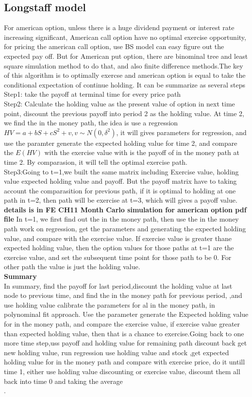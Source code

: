 \documentclass[a4paper,11pt]{article}
\begin{document}
\subsection{Longstaff model}
For american option, unless there is a huge dividend payment or interest rate increasing significant, American call option have no optimal exercise opportunity, for pricing the american call option, use BS model can easy figure out the expected pay off. But for American put option, there are binominal tree and least square simulation method to do that, and also finite difference methods.The key of this algorithm is to optimally exercse and american option is equal to take the conditional expectation of continue holding. It can be summarize as several steps\\
Step1: take the payoff at terminal time for every price path\\
Step2: Calculate the holding value as the present value of option in next time point, discount the previous payoff into period 2 as the holding value. At time 2, we find the in the money path, the idea is use a regression $HV=a+bS+cS^2+v,v\sim N(0,\delta^2)$, it will gives parameters for regression, and use the paramter generate the expected holding value for time 2, and compare the $E(HV)$ with the exercise value with is the payoff of in the money path at time 2. By comparasion, it will tell the optimal exercise path.\\
Step3:Going to t=1,we built the same matrix including Exercise value, holding value expected holding value and payoff. But the payoff matrix have to taking account the comparasition for previous path, if it is optimal to holding at one path in t=2, then path will be exercise at t=3, which will gives a payoff value. {\bf details is in FE CH11 Month Carlo simulation for american option pdf file} In t=1, we first find out the in the money path, then use the in the money path work on regression, get the parameters and generating the expected holding value, and compare with the exercise value. If exercise value is greater thane expected holding value, then the option values for those paths at t=1 are the exercise value, and set the subsequent time point for those path to be 0. For other path the value is just the holding value.\\
{\bf Summary}\\
In summary, find the payoff for last period,discount the holding value at last node to previous time, and find the in the money path for previous period, ,and use holding value calibrate the parameters for al in the money path, in polynominal fit approach. Use the parameter generate the Expected holding value for in the money path, and compare the exercise value, if exercise value greater than expected holding value, then that is a chance to exercise.Going back to one more time step,uss payoff and holding value for remaining path discount back get new holding value, run regression use holding value and stock ,get expected holding value for in the money path and compare with exercise price, do it untill time 1, either use holding value discounting or exercise value, discount them all back into time 0 and taking the average\\.
\end{document}
